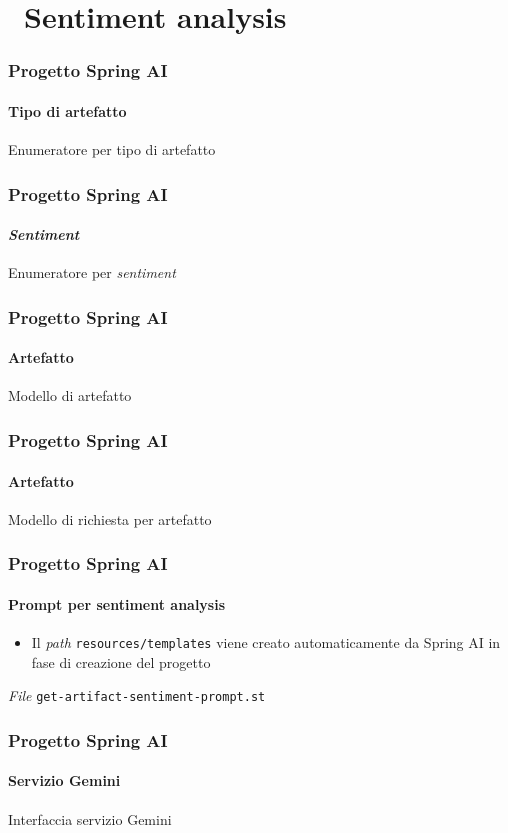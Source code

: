 \section{\faWrench\ Sentiment analysis} %
\label{sec:spring-ai-gemini-zero-shot-prompting-sentiment-analysis}
%
\begin{frame}[t,fragile] \frametitle{Progetto Spring AI}
    \framesubtitle{Tipo di artefatto}
        \begin{block}{Enumeratore per tipo di artefatto}
			{\tiny}
    	\end{block}
\end{frame}
%
\begin{frame}[t,fragile] \frametitle{Progetto Spring AI}
    \framesubtitle{\textit{Sentiment}}
        \begin{block}{Enumeratore per \textit{sentiment}}
			{\tiny}
    	\end{block}
\end{frame}
%
\begin{frame}[t,fragile] \frametitle{Progetto Spring AI}
    \framesubtitle{Artefatto}
        \begin{block}{Modello di artefatto}
			{\tiny}
    	\end{block}
\end{frame}
%
\begin{frame}[t,fragile] \frametitle{Progetto Spring AI}
    \framesubtitle{Artefatto}
        \begin{block}{Modello di richiesta per artefatto}
			{\tiny}
    	\end{block}
\end{frame}
%
\begin{frame}[t,fragile] \frametitle{Progetto Spring AI}
    \framesubtitle{Prompt per sentiment analysis}
        \begin{itemize}[leftmargin=10pt,align=right]
		    \item[\alert{\faExclamationTriangle}] Il \textit{path} \texttt{resources/templates} viene creato automaticamente da Spring AI in fase di creazione del progetto
        \end{itemize}
        \begin{block}{\textit{File} \texttt{get-artifact-sentiment-prompt.st}}
			{\scriptsize}
    	\end{block}
\end{frame}
%
\begin{frame}[t,fragile] \frametitle{Progetto Spring AI}
    \framesubtitle{Servizio Gemini}
        \begin{block}{Interfaccia servizio Gemini}
{\tiny}
    \end{block}
\end{frame}
